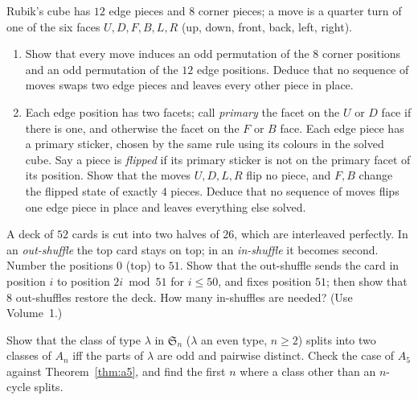 \begin{exercise}[$\star\star$]\label{ex:rubik}
Rubik's cube has $12$ edge pieces and $8$ corner pieces; a move is a quarter turn of one of the six faces $U,D,F,B,L,R$ (up, down, front, back, left, right).
\begin{enumerate}[label=(\alph*)]
\item Show that every move induces an odd permutation of the $8$ corner positions and an odd permutation of the $12$ edge positions. Deduce that no sequence of moves swaps two edge pieces and leaves every other piece in place.
\item Each edge position has two facets; call \emph{primary} the facet on the $U$ or $D$ face if there is one, and otherwise the facet on the $F$ or $B$ face. Each edge piece has a primary sticker, chosen by the same rule using its colours in the solved cube. Say a piece is \emph{flipped} if its primary sticker is not on the primary facet of its position. Show that the moves $U,D,L,R$ flip no piece, and $F,B$ change the flipped state of exactly $4$ pieces. Deduce that no sequence of moves flips one edge piece in place and leaves everything else solved.
\end{enumerate}
\end{exercise}

\begin{exercise}[$\star\star$]\label{ex:shuffle}
A deck of $52$ cards is cut into two halves of $26$, which are interleaved perfectly. In an \emph{out-shuffle} the top card stays on top; in an \emph{in-shuffle} it becomes second. Number the positions $0$ (top) to $51$. Show that the out-shuffle sends the card in position $i$ to position $2i\bmod 51$ for $i\le50$, and fixes position $51$; then show that $8$ out-shuffles restore the deck. How many in-shuffles are needed? (Use Volume~1.)
\end{exercise}

\begin{exercise}[$\star\star\star$]\label{ex:split}
Show that the class of type $\lambda$ in $\mathfrak S_n$ ($\lambda$ an even type, $n\ge2$) splits into two classes of $A_n$ iff the parts of $\lambda$ are odd and pairwise distinct. Check the case of $A_5$ against Theorem~\ref{thm:a5}, and find the first $n$ where a class other than an $n$-cycle splits.
\end{exercise}

